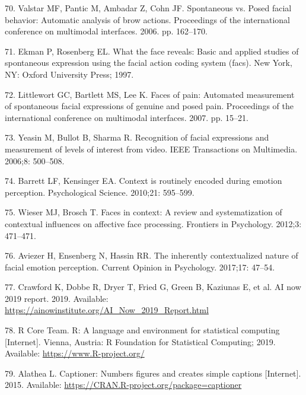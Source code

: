 \documentclass[10pt,letterpaper]{article}
\begin{document}
\leavevmode\hypertarget{ref-valstar2006spontaneous}{}%
70. Valstar MF, Pantic M, Ambadar Z, Cohn JF. Spontaneous vs. Posed facial behavior: Automatic analysis of brow actions. Proceedings of the international conference on multimodal interfaces. 2006. pp. 162--170.

\leavevmode\hypertarget{ref-ekman1997face}{}%
71. Ekman P, Rosenberg EL. What the face reveals: Basic and applied studies of spontaneous expression using the facial action coding system (facs). New York, NY: Oxford University Press; 1997.

\leavevmode\hypertarget{ref-littlewort2007faces}{}%
72. Littlewort GC, Bartlett MS, Lee K. Faces of pain: Automated measurement of spontaneous facial expressions of genuine and posed pain. Proceedings of the international conference on multimodal interfaces. 2007. pp. 15--21.

\leavevmode\hypertarget{ref-yeasin2006recognition}{}%
73. Yeasin M, Bullot B, Sharma R. Recognition of facial expressions and measurement of levels of interest from video. IEEE Transactions on Multimedia. 2006;8: 500--508.

\leavevmode\hypertarget{ref-barrett2010context}{}%
74. Barrett LF, Kensinger EA. Context is routinely encoded during emotion perception. Psychological Science. 2010;21: 595--599.

\leavevmode\hypertarget{ref-wieser2012faces}{}%
75. Wieser MJ, Brosch T. Faces in context: A review and systematization of contextual influences on affective face processing. Frontiers in Psychology. 2012;3: 471--471.

\leavevmode\hypertarget{ref-aviezer2017the}{}%
76. Aviezer H, Ensenberg N, Hassin RR. The inherently contextualized nature of facial emotion perception. Current Opinion in Psychology. 2017;17: 47--54.

\leavevmode\hypertarget{ref-crawford2019ai}{}%
77. Crawford K, Dobbe R, Dryer T, Fried G, Green B, Kaziunas E, et al. AI now 2019 report. 2019. Available: \url{https://ainowinstitute.org/AI_Now_2019_Report.html}

\leavevmode\hypertarget{ref-R-base}{}%
78. R Core Team. R: A language and environment for statistical computing {[}Internet{]}. Vienna, Austria: R Foundation for Statistical Computing; 2019. Available: \url{https://www.R-project.org/}

\leavevmode\hypertarget{ref-R-captioner}{}%
79. Alathea L. Captioner: Numbers figures and creates simple captions {[}Internet{]}. 2015. Available: \url{https://CRAN.R-project.org/package=captioner}
\end{document}
